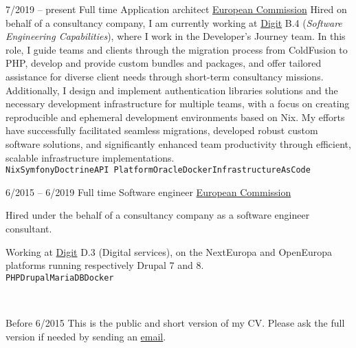 \begin{entrylist}
	\entry
		{7/2019 -- present}
        {Full time}
		{Application architect}
        {\href{https://ec.europa.eu/}{European Commission}}
        {
            Hired on behalf of a consultancy company, I am currently working at
            \href{https://ec.europa.eu/info/departments/informatics_en}{Digit} B.4 (\textit{Software Engineering Capabilities}),
            where I work in the Developer's Journey team. In this role, I guide teams and clients
            through the migration process from ColdFusion to PHP, develop and provide custom
            bundles and packages, and offer tailored assistance for diverse client needs through
            short-term consultancy missions. Additionally, I design and implement authentication libraries
            solutions and the necessary development infrastructure for multiple teams, with
            a focus on creating reproducible and ephemeral development environments based on Nix.
            My efforts have successfully facilitated seamless migrations, developed robust custom
            software solutions, and significantly enhanced team productivity through efficient,
            scalable infrastructure implementations.
			\\ \texttt{Nix}\slashsep\texttt{Symfony}\slashsep\texttt{Doctrine}\slashsep\texttt{API Platform}\slashsep\texttt{Oracle}\slashsep\texttt{Docker}\slashsep\texttt{InfrastructureAsCode}
        }

	\entry
		{6/2015 -- 6/2019}
        {Full time}
		{Software engineer}
        {\href{https://ec.europa.eu/}{European Commission}}
        {
			Hired under the behalf of a consultancy company as a software engineer consultant.

			Working at \href{https://ec.europa.eu/info/departments/informatics_en}{Digit} D.3 (Digital services),
			on the NextEuropa and OpenEuropa platforms running respectively Drupal 7 and 8.
			\\ \texttt{PHP}\slashsep\texttt{Drupal}\slashsep\texttt{MariaDB}\slashsep\texttt{Docker}
        }\

    \entry
        {\color{black!50}Before 6/2015}
        {}
        {}
        {}
        {\footnotesize{\color{black!50}This is the public and short version of my CV. Please ask the full version if needed by sending an \href{mailto:pol.dellaiera@protonmail.com}{email}.}}
\end{entrylist}


